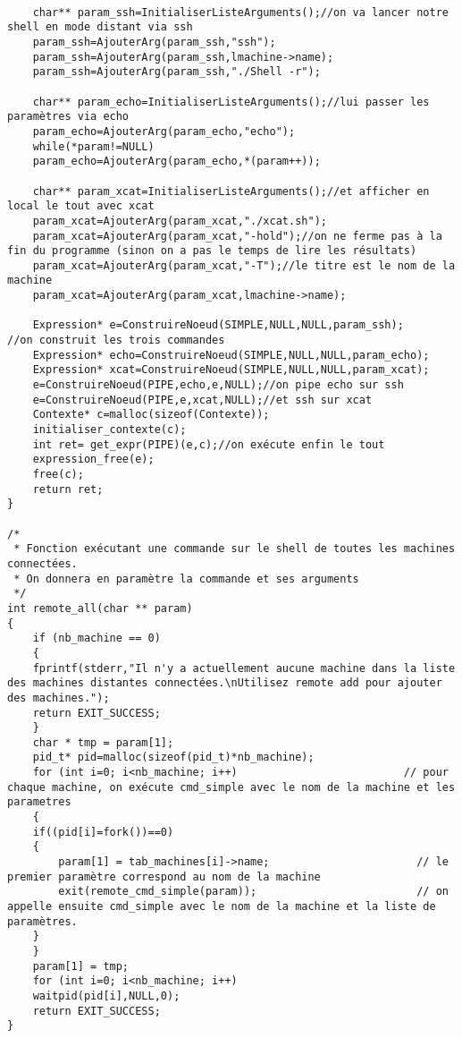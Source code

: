 \documentclass[12pt]{article}
\begin{document}
\begin{verbatim}
    
    char** param_ssh=InitialiserListeArguments();//on va lancer notre shell en mode distant via ssh
    param_ssh=AjouterArg(param_ssh,"ssh");
    param_ssh=AjouterArg(param_ssh,lmachine->name);
    param_ssh=AjouterArg(param_ssh,"./Shell -r");

    char** param_echo=InitialiserListeArguments();//lui passer les paramètres via echo
    param_echo=AjouterArg(param_echo,"echo");
    while(*param!=NULL)
	param_echo=AjouterArg(param_echo,*(param++));
    
    char** param_xcat=InitialiserListeArguments();//et afficher en local le tout avec xcat
    param_xcat=AjouterArg(param_xcat,"./xcat.sh");
    param_xcat=AjouterArg(param_xcat,"-hold");//on ne ferme pas à la fin du programme (sinon on a pas le temps de lire les résultats)
    param_xcat=AjouterArg(param_xcat,"-T");//le titre est le nom de la machine
    param_xcat=AjouterArg(param_xcat,lmachine->name);
    
    Expression* e=ConstruireNoeud(SIMPLE,NULL,NULL,param_ssh);     //on construit les trois commandes
    Expression* echo=ConstruireNoeud(SIMPLE,NULL,NULL,param_echo);
    Expression* xcat=ConstruireNoeud(SIMPLE,NULL,NULL,param_xcat);
    e=ConstruireNoeud(PIPE,echo,e,NULL);//on pipe echo sur ssh
    e=ConstruireNoeud(PIPE,e,xcat,NULL);//et ssh sur xcat
    Contexte* c=malloc(sizeof(Contexte));
    initialiser_contexte(c);
    int ret= get_expr(PIPE)(e,c);//on exécute enfin le tout
    expression_free(e);
    free(c);
    return ret;
}

/* 
 * Fonction exécutant une commande sur le shell de toutes les machines connectées.
 * On donnera en paramètre la commande et ses arguments
 */
int remote_all(char ** param) 
{
    if (nb_machine == 0)
    {
	fprintf(stderr,"Il n'y a actuellement aucune machine dans la liste des machines distantes connectées.\nUtilisez remote add pour ajouter des machines.");
	return EXIT_SUCCESS;
    }
    char * tmp = param[1];
    pid_t* pid=malloc(sizeof(pid_t)*nb_machine);
    for (int i=0; i<nb_machine; i++)                          // pour chaque machine, on exécute cmd_simple avec le nom de la machine et les parametres
    {
	if((pid[i]=fork())==0)
	{
	    param[1] = tab_machines[i]->name;                       // le premier paramètre correspond au nom de la machine  
	    exit(remote_cmd_simple(param));                         // on appelle ensuite cmd_simple avec le nom de la machine et la liste de paramètres.
	}
    }
    param[1] = tmp;
    for (int i=0; i<nb_machine; i++)
	waitpid(pid[i],NULL,0);
    return EXIT_SUCCESS;
}
				  

\end{verbatim}
\label{}
\begin{verbatim}
 
\end{verbatim}
\end{document}
